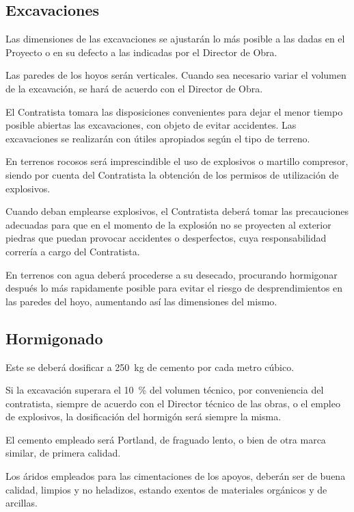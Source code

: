 \subsection{Excavaciones}
\label{subsec:pliego-excavacionesCT}
Las dimensiones de las excavaciones se ajustarán lo más posible a las dadas en el Proyecto o en su defecto a las indicadas por el Director de Obra.  

Las paredes de los hoyos serán verticales. Cuando sea necesario variar el volumen de la excavación, se hará de acuerdo con el Director de Obra.  

El Contratista tomara las disposiciones convenientes para dejar el menor tiempo posible abiertas las excavaciones, con objeto de evitar accidentes. Las excavaciones se realizarán con útiles apropiados según el tipo de terreno.   

En terrenos rocosos será imprescindible el uso de explosivos o martillo compresor, siendo por cuenta del Contratista la obtención de los permisos de  utilización de explosivos.  

Cuando deban emplearse explosivos, el Contratista deberá tomar las precauciones adecuadas para que en el momento de la explosión no se proyecten al exterior piedras que puedan provocar accidentes o desperfectos, cuya responsabilidad correría a cargo del Contratista.

En terrenos con agua deberá procederse a su desecado, procurando hormigonar después lo más rapidamente posible para evitar el riesgo de desprendimientos en las paredes del hoyo, aumentando así las dimensiones del mismo.

\subsection{Hormigonado}
\label{subsec:pliego-hormigonadoCT}
Este se deberá dosificar a \SI{250}{\kilo\gram} de cemento por cada metro cúbico.

Si la excavación superara el \SI{10}{\percent} del volumen técnico, por conveniencia del contratista, siempre de acuerdo con el Director técnico de las obras, o el empleo de explosivos, la dosificación del hormigón será siempre la misma.

El cemento empleado será Portland, de fraguado lento, o bien de otra marca similar, de primera calidad.
    
Los áridos empleados para las cimentaciones de los apoyos, deberán ser de buena calidad, limpios y no heladizos, estando exentos de materiales orgánicos y de arcillas.

